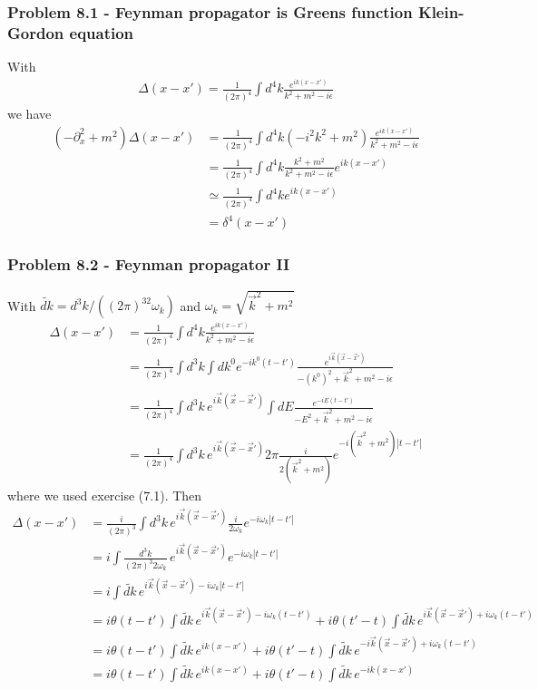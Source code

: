 \documentclass[10pt,a4paper]{article}
\theoremstyle{definition}
\begin{document}
\subsubsection{Problem 8.1 - Feynman propagator is Greens function Klein-Gordon equation}
With
\begin{align}
\Delta(x-x')=\frac{1}{(2\pi)^4}\int d^4k\frac{e^{ik(x-x')}}{k^2+m^2-i\epsilon}
\end{align}
we have
\begin{align}
(-\partial_x^2+m^2)\Delta(x-x')
&=\frac{1}{(2\pi)^4}\int d^4k(-i^2k^2+m^2)\frac{e^{ik(x-x')}}{k^2+m^2-i\epsilon}\\
&=\frac{1}{(2\pi)^4}\int d^4k\frac{k^2+m^2}{k^2+m^2-i\epsilon}e^{ik(x-x')}\\
&\simeq\frac{1}{(2\pi)^4}\int d^4ke^{ik(x-x')}\\
&=\delta^4(x-x')
\end{align}

\subsubsection{Problem 8.2 - Feynman propagator II}
With $\widetilde{dk}=d^3k/((2\pi)^32\omega_k)$ and $\omega_k=\sqrt{\vec{k}^2+m^2}$
\begin{align}
\Delta(x-x')
&=\frac{1}{(2\pi)^4}\int d^4k\frac{e^{ik(x-x')}}{k^2+m^2-i\epsilon}\\
&=\frac{1}{(2\pi)^4}\int d^3k\int dk^0e^{-ik^0(t-t')}\frac{e^{i\vec{k}(\vec{x}-\vec{x}')}}{-(k^0)^2+\vec{k}^2+m^2-i\epsilon}\\
&=\frac{1}{(2\pi)^4}\int d^3k\,e^{i\vec{k}(\vec{x}-\vec{x}')}\int dE\frac{e^{-iE(t-t')}}{-E^2+\vec{k}^2+m^2-i\epsilon}\\
&=\frac{1}{(2\pi)^4}\int d^3k\,e^{i\vec{k}(\vec{x}-\vec{x}')}2\pi\frac{i}{2(\vec{k}^2+m^2)}e^{-i(\vec{k}^2+m^2)|t-t'|}
\end{align}
where we used exercise (7.1). Then
\begin{align}
\Delta(x-x')
&=\frac{i}{(2\pi)^3}\int d^3k\,e^{i\vec{k}(\vec{x}-\vec{x}')}\frac{i}{2\omega_k}e^{-i\omega_k|t-t'|}\\
&=i\int\frac{d^3k}{(2\pi)^3 2\omega_k}\,e^{i\vec{k}(\vec{x}-\vec{x}')}e^{-i\omega_k|t-t'|}\\
&=i\int\widetilde{dk}\,e^{i\vec{k}(\vec{x}-\vec{x}')-i\omega_k|t-t'|}\\
&=i\theta(t-t')\int\widetilde{dk}\,e^{i\vec{k}(\vec{x}-\vec{x}')-i\omega_k(t-t')}+i\theta(t'-t)\int\widetilde{dk}\,e^{i\vec{k}(\vec{x}-\vec{x}')+i\omega_k(t-t')}\\
&=i\theta(t-t')\int\widetilde{dk}\,e^{ik(x-x')}+i\theta(t'-t)\int\widetilde{dk}\,e^{-i\vec{k}(\vec{x}-\vec{x}')+i\omega_k(t-t')}\\
&=i\theta(t-t')\int\widetilde{dk}\,e^{ik(x-x')}+i\theta(t'-t)\int\widetilde{dk}\,e^{-ik(x-x')}\\
\end{align}
\end{document}
